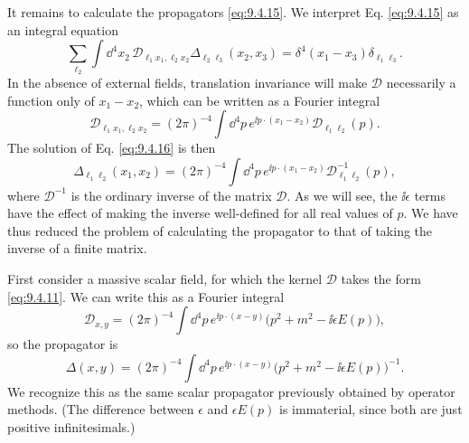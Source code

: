 It remains to calculate the propagators \eqref{eq:9.4.15}. We interpret Eq. \eqref{eq:9.4.15} as
an integral equation
\begin{equation}
\sum_{\ell_2}\int \dd^4x_2\,
 \mathcal D_{\ell_1x_1,\ell_2x_2}
 \Delta_{\ell_2\ell_3}(x_2,x_3)
=\delta^4(x_1-x_3)\delta_{\ell_1\ell_3}.
\tag{9.4.16}\label{eq:9.4.16}
\end{equation}
In the absence of external fields, translation invariance will make
$\mathcal D$ necessarily a function only of $x_1-x_2$, which can be written as
a Fourier integral
\begin{equation}
\mathcal D_{\ell_1x_1,\ell_2x_2}
=(2\pi)^{-4}\int \dd^4p\,e^{\ii p\cdot(x_1-x_2)}
 \mathcal D_{\ell_1\ell_2}(p).
\tag{9.4.17}\label{eq:9.4.17}
\end{equation}
The solution of Eq. \eqref{eq:9.4.16} is then
\begin{equation}
\Delta_{\ell_1\ell_2}(x_1,x_2)
=(2\pi)^{-4}\int \dd^4p\,e^{\ii p\cdot(x_1-x_2)}
 \mathcal D^{-1}_{\ell_1\ell_2}(p),
\tag{9.4.18}\label{eq:9.4.18}
\end{equation}
where $\mathcal D^{-1}$ is the ordinary inverse of the matrix $\mathcal D$.
As we will see, the $\ii\epsilon$ terms have the effect of making the inverse
well-defined for all real values of $p$. We have thus reduced the problem of
calculating the propagator to that of taking the inverse of a finite matrix.

First consider a massive scalar field, for which the kernel $\mathcal D$ takes
the form \eqref{eq:9.4.11}. We can write this as a Fourier integral
\[
\mathcal D_{x,y}=(2\pi)^{-4}\int \dd^4p\,e^{\ii p\cdot(x-y)}
 \bigl(p^2+m^2-\ii\epsilon E(p)\bigr),
\]
so the propagator is
\[
\Delta(x,y)=(2\pi)^{-4}\int \dd^4p\,e^{\ii p\cdot(x-y)}
 \bigl(p^2+m^2-\ii\epsilon E(p)\bigr)^{-1}.
\]
We recognize this as the same scalar propagator previously obtained by
operator methods. (The difference between $\epsilon$ and $\epsilon E(p)$ is
immaterial, since both are just positive infinitesimals.)

